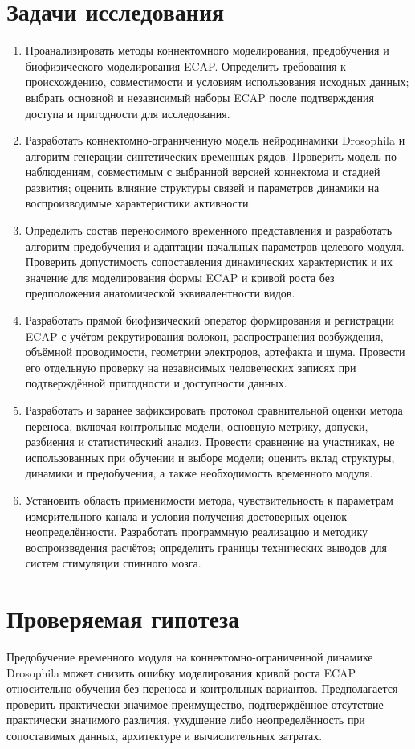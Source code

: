 \section*{Задачи исследования}
\begin{enumerate}
\setlength{\itemsep}{3pt}

\item Проанализировать методы коннектомного моделирования, предобучения и биофизического моделирования ECAP. Определить требования к происхождению, совместимости и условиям использования исходных данных; выбрать основной и независимый наборы ECAP после подтверждения доступа и пригодности для исследования.
\item Разработать коннектомно-ограниченную модель нейродинамики Drosophila и алгоритм генерации синтетических временных рядов. Проверить модель по наблюдениям, совместимым с выбранной версией коннектома и стадией развития; оценить влияние структуры связей и параметров динамики на воспроизводимые характеристики активности.
\item Определить состав переносимого временного представления и разработать алгоритм предобучения и адаптации начальных параметров целевого модуля. Проверить допустимость сопоставления динамических характеристик и их значение для моделирования формы ECAP и кривой роста без предположения анатомической эквивалентности видов.
\item Разработать прямой биофизический оператор формирования и регистрации ECAP с учётом рекрутирования волокон, распространения возбуждения, объёмной проводимости, геометрии электродов, артефакта и шума. Провести его отдельную проверку на независимых человеческих записях при подтверждённой пригодности и доступности данных.
\item Разработать и заранее зафиксировать протокол сравнительной оценки метода переноса, включая контрольные модели, основную метрику, допуски, разбиения и статистический анализ. Провести сравнение на участниках, не использованных при обучении и выборе модели; оценить вклад структуры, динамики и предобучения, а также необходимость временного модуля.
\item Установить область применимости метода, чувствительность к параметрам измерительного канала и условия получения достоверных оценок неопределённости. Разработать программную реализацию и методику воспроизведения расчётов; определить границы технических выводов для систем стимуляции спинного мозга.
\end{enumerate}
\section*{Проверяемая гипотеза}
Предобучение временного модуля на коннектомно-ограниченной динамике Drosophila может снизить ошибку моделирования кривой роста ECAP относительно обучения без переноса и контрольных вариантов. Предполагается проверить практически значимое преимущество, подтверждённое отсутствие практически значимого различия, ухудшение либо неопределённость при сопоставимых данных, архитектуре и вычислительных затратах.
